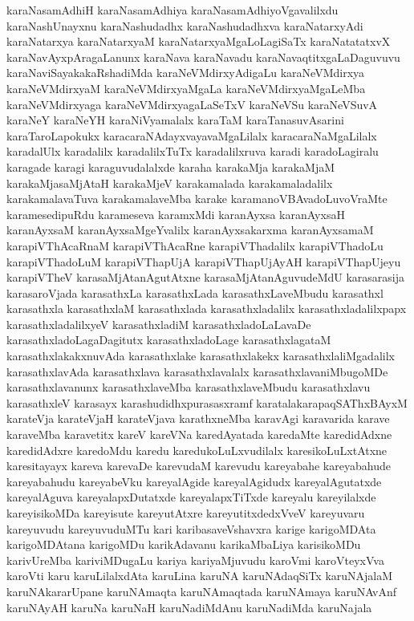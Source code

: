 {karaNasamAdhiH
karaNasamAdhiya
karaNasamAdhiyoVgavalilxdu
karaNashUnayxnu
karaNashudadhx
karaNashudadhxva
karaNatarxyAdi
karaNatarxya
karaNatarxyaM
karaNatarxyaMgaLoLagiSaTx
karaNatatatxvX
karaNavAyxpAragaLanunx
karaNava
karaNavadu
karaNavaqtitxgaLaDaguvuvu
karaNaviSayakakaRshadiMda
karaNeVMdirxyAdigaLu
karaNeVMdirxya
karaNeVMdirxyaM
karaNeVMdirxyaMgaLa
karaNeVMdirxyaMgaLeMba
karaNeVMdirxyaga
karaNeVMdirxyagaLaSeTxV
karaNeVSu
karaNeVSuvA
karaNeY
karaNeYH
karaNiVyamalalx
karaTaM
karaTanasuvAsarini
karaTaroLapokukx
karacaraNAdayxvayavaMgaLilalx
karacaraNaMgaLilalx
karadalUlx
karadalilx
karadalilxTuTx
karadalilxruva
karadi
karadoLagiralu
karagade
karagi
karaguvudalalxde
karaha
karakaMja
karakaMjaM
karakaMjasaMjAtaH
karakaMjeV
karakamalada
karakamaladalilx
karakamalavaTuva
karakamalaveMba
karake
karamanoVBAvadoLuvoVraMte
karamesedipuRdu
karameseva
karamxMdi
karanAyxsa
karanAyxsaH
karanAyxsaM
karanAyxsaMgeYvalilx
karanAyxsakarxma
karanAyxsamaM
karapiVThAcaRnaM
karapiVThAcaRne
karapiVThadalilx
karapiVThadoLu
karapiVThadoLuM
karapiVThapUjA
karapiVThapUjAyAH
karapiVThapUjeyu
karapiVTheV
karasaMjAtanAgutAtxne
karasaMjAtanAguvudeMdU
karasarasija
karasaroVjada
karasathxLa
karasathxLada
karasathxLaveMbudu
karasathxl
karasathxla
karasathxlaM
karasathxlada
karasathxladalilx
karasathxladalilxpapx
karasathxladalilxyeV
karasathxladiM
karasathxladoLaLavaDe
karasathxladoLagaDagitutx
karasathxladoLage
karasathxlagataM
karasathxlakakxnuvAda
karasathxlake
karasathxlakekx
karasathxlaliMgadalilx
karasathxlavAda
karasathxlava
karasathxlavalalx
karasathxlavaniMbugoMDe
karasathxlavanunx
karasathxlaveMba
karasathxlaveMbudu
karasathxlavu
karasathxleV
karasayx
karashudidhxpurasasxramf
karatalakarapaqSAThxBAyxM
karateVja
karateVjaH
karateVjava
karathxneMba
karavAgi
karavarida
karave
karaveMba
karavetitx
kareV
kareVNa
karedAyatada
karedaMte
karedidAdxne
karedidAdxre
karedoMdu
karedu
karedukoLuLxvudilalx
karesikoLuLxtAtxne
karesitayayx
kareva
karevaDe
karevudaM
karevudu
kareyabahe
kareyabahude
kareyabahudu
kareyabeVku
kareyalAgide
kareyalAgidudx
kareyalAgutatxde
kareyalAguva
kareyalapxDutatxde
kareyalapxTiTxde
kareyalu
kareyilalxde
kareyisikoMDa
kareyisute
kareyutAtxre
kareyutitxdedxVveV
kareyuvaru
kareyuvudu
kareyuvuduMTu
kari
karibasaveVshavxra
karige
karigoMDAta
karigoMDAtana
karigoMDu
karikAdavanu
karikaMbaLiya
karisikoMDu
karivUreMba
kariviMDugaLu
kariya
kariyaMjuvudu
karoVmi
karoVteyxVva
karoVti
karu
karuLilalxdAta
karuLina
karuNA
karuNAdaqSiTx
karuNAjalaM
karuNAkararUpane
karuNAmaqta
karuNAmaqtada
karuNAmaya
karuNAvAnf
karuNAyAH
karuNa
karuNaH
karuNadiMdAnu
karuNadiMda
karuNajala
}
